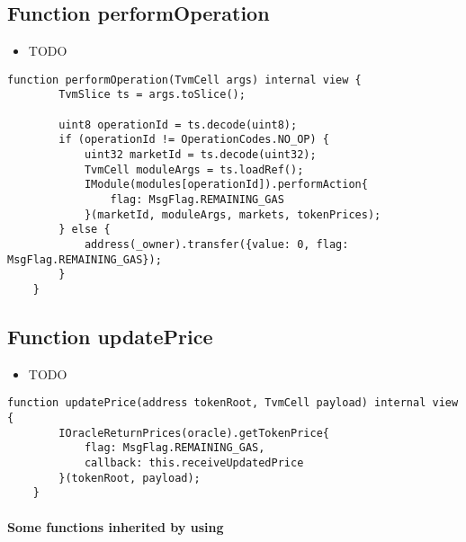 \subsection{Function performOperation}

\noindent\begin{itemize}
\item TODO
\end{itemize}

\begin{lstlisting}[firstnumber=361]
    function performOperation(TvmCell args) internal view {
        TvmSlice ts = args.toSlice();

        uint8 operationId = ts.decode(uint8);
        if (operationId != OperationCodes.NO_OP) {
            uint32 marketId = ts.decode(uint32);
            TvmCell moduleArgs = ts.loadRef();
            IModule(modules[operationId]).performAction{
                flag: MsgFlag.REMAINING_GAS
            }(marketId, moduleArgs, markets, tokenPrices);
        } else {
            address(_owner).transfer({value: 0, flag: MsgFlag.REMAINING_GAS});
        }
    }
\end{lstlisting}

\subsection{Function updatePrice}

\noindent\begin{itemize}
\item TODO
\end{itemize}

\begin{lstlisting}[firstnumber=428]
    function updatePrice(address tokenRoot, TvmCell payload) internal view {
        IOracleReturnPrices(oracle).getTokenPrice{
            flag: MsgFlag.REMAINING_GAS,
            callback: this.receiveUpdatedPrice
        }(tokenRoot, payload);
    }
\end{lstlisting}
\paragraph{Some functions inherited by using}
